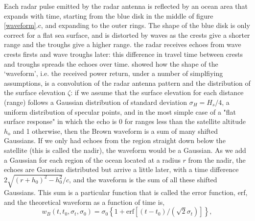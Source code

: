 
Each radar pulse emitted by the radar antenna is  reflected by an ocean area that expands with time, starting from the blue disk in the middle of figure \ref{waveform}.c, and 
expanding to the outer rings. The shape of the blue disk is only correct for a flat sea surface, and is distorted by waves as the crests give a shorter range and the troughs give a higher range. 
the radar receives echoes from wave crests firsts and wave troughs later: this difference in travel time between crests and troughs  
spreads the echoes over time. \cite{Brown1977} showed how the shape of the `waveform',  i.e. the received power return, under a number 
of simplfiying assumptions, is a convolution 
of the radar antenna pattern and the distribution of the surface elevation $\zeta$: if we assume that the surface elevation for each 
distance (range) follows a Gaussian distribution of standard deviation $\sigma_H=H_s/4$, a uniform distribution of specular points, and in the most simple case of a "flat surface response" in which the echo is 0 for ranges less than the satellite altitude $h_{\mathrm{o}}$ and 1 otherwise, then the Brown waveform is a sum of many shifted Gaussians. If we only had echoes from the region straight down below the satellite (this is called the nadir), the waveform would be a Gaussian. As we add a Gaussian for each region of the ocean located at a radius $r$ from the nadir, the echoes are Gaussian distributed but arrive a little later, with a time difference $2 \sqrt{(r+h_0)^2-h_0^2}/c$, and the waveform is the sum of all these shifted Gaussians.  This sum is a particular function that is called the error function, erf, and the  theoretical waveform as a function of time is, 
\begin{equation}
    w_B(t,t_0,\sigma_t,\sigma_0)=  \sigma_0 \left\{ 1+ \mathrm{erf}\left[(t-t_0)/( \sqrt{2} \sigma_t) \right] \right\}, \label{Brown}
\end{equation}
